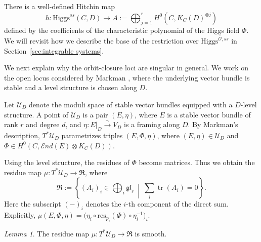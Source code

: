\documentclass[11pt]{amsart}
\theoremstyle{plain}
\theoremstyle{definition}
\theoremstyle{remark}
\newtheorem{lemma}[theorem]{Lemma}
\newcommand{\End}{\mathcal E nd}
\newcommand{\ov}[1]{\overline{#1}}
\newcommand{\cO}{\mathcal O}
\newcommand{\Higgs}{\mathrm{Higgs}}
\def\res{\mathrm{res}}
\begin{document}
There is a well-defined Hitchin map \[h:\Higgs^{ss}(C,D) \to A:=\bigoplus_{j=1}^rH^0(C,K_C(D)^{\otimes j})\]
defined by the coefficients of the characteristic polynomial of the Higgs field $\Phi$. We will revisit how we describe the base of the restriction over $\Higgs^{\ov\cO,ss}$ in Section~\ref{sec:integrable systems}. 

We next explain why the orbit-closure loci are singular in general. We work on the open locus considered by Markman \cite{markmanspectral}, where the underlying vector bundle is stable and a level structure is chosen along $D$.

Let $\mathcal U_D$ denote the moduli space of stable vector bundles equipped with a $D$-level structure. A point of $\mathcal U_D$ is a pair $(E,\eta)$, where $E$ is a stable vector bundle of rank $r$ and degree $d$, and $\eta:E|_D\xrightarrow{\sim}V_D$ is a framing along $D$. By Markman's description, $T^*\mathcal U_D$ parametrizes triples $(E,\Phi,\eta)$, where $(E,\eta)\in\mathcal U_D$ and
$\Phi\in H^0(C,\End(E)\otimes K_C(D))$.

Using the level structure, the residues of $\Phi$ become matrices. Thus we obtain the residue map $\mu:T^*\mathcal U_D\longrightarrow \mathfrak R$,
where
\[
\mathfrak R:=
\left\{
(A_i)_i\in\bigoplus_i\mathfrak{gl}_r
\ \middle|\
\sum_i\operatorname{tr}(A_i)=0
\right\}.
\]
Here the subscript $(-)_i$ denotes the $i$-th component of the direct sum. Explicitly,
$\mu(E,\Phi,\eta)=
\bigl(\eta_i\circ \res_{p_i}(\Phi)\circ\eta_i^{-1}\bigr)_i.$

\begin{lemma}\label{lem:markman-residue-submersion}
	The residue map $\mu:T^*\mathcal U_D\to\mathfrak R$ is smooth.
\end{lemma}
\end{document}
